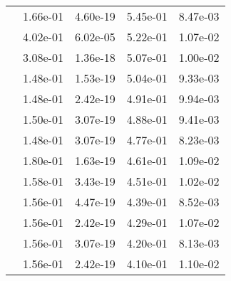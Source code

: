\begin{table}
\begin{tabular}{c|cc|cc|}
\multicolumn{1}{|c|}{} & \multicolumn{1}{|c|}{  1.66e-01} & \multicolumn{1}{|c|}{  4.60e-19} & \multicolumn{1}{|c|}{  5.45e-01} & \multicolumn{1}{|c|}{  8.47e-03} \\ 
\multicolumn{1}{|c|}{} & \multicolumn{1}{|c|}{  4.02e-01} & \multicolumn{1}{|c|}{  6.02e-05} & \multicolumn{1}{|c|}{  5.22e-01} & \multicolumn{1}{|c|}{  1.07e-02} \\ 
\multicolumn{1}{|c|}{} & \multicolumn{1}{|c|}{  3.08e-01} & \multicolumn{1}{|c|}{  1.36e-18} & \multicolumn{1}{|c|}{  5.07e-01} & \multicolumn{1}{|c|}{  1.00e-02} \\ 
\multicolumn{1}{|c|}{} & \multicolumn{1}{|c|}{  1.48e-01} & \multicolumn{1}{|c|}{  1.53e-19} & \multicolumn{1}{|c|}{  5.04e-01} & \multicolumn{1}{|c|}{  9.33e-03} \\ 
\multicolumn{1}{|c|}{} & \multicolumn{1}{|c|}{  1.48e-01} & \multicolumn{1}{|c|}{  2.42e-19} & \multicolumn{1}{|c|}{  4.91e-01} & \multicolumn{1}{|c|}{  9.94e-03} \\ 
\multicolumn{1}{|c|}{} & \multicolumn{1}{|c|}{  1.50e-01} & \multicolumn{1}{|c|}{  3.07e-19} & \multicolumn{1}{|c|}{  4.88e-01} & \multicolumn{1}{|c|}{  9.41e-03} \\ 
\multicolumn{1}{|c|}{} & \multicolumn{1}{|c|}{  1.48e-01} & \multicolumn{1}{|c|}{  3.07e-19} & \multicolumn{1}{|c|}{  4.77e-01} & \multicolumn{1}{|c|}{  8.23e-03} \\ 
\multicolumn{1}{|c|}{} & \multicolumn{1}{|c|}{  1.80e-01} & \multicolumn{1}{|c|}{  1.63e-19} & \multicolumn{1}{|c|}{  4.61e-01} & \multicolumn{1}{|c|}{  1.09e-02} \\ 
\multicolumn{1}{|c|}{} & \multicolumn{1}{|c|}{  1.58e-01} & \multicolumn{1}{|c|}{  3.43e-19} & \multicolumn{1}{|c|}{  4.51e-01} & \multicolumn{1}{|c|}{  1.02e-02} \\ 
\multicolumn{1}{|c|}{} & \multicolumn{1}{|c|}{  1.56e-01} & \multicolumn{1}{|c|}{  4.47e-19} & \multicolumn{1}{|c|}{  4.39e-01} & \multicolumn{1}{|c|}{  8.52e-03} \\ 
\multicolumn{1}{|c|}{} & \multicolumn{1}{|c|}{  1.56e-01} & \multicolumn{1}{|c|}{  2.42e-19} & \multicolumn{1}{|c|}{  4.29e-01} & \multicolumn{1}{|c|}{  1.07e-02} \\ 
\multicolumn{1}{|c|}{} & \multicolumn{1}{|c|}{  1.56e-01} & \multicolumn{1}{|c|}{  3.07e-19} & \multicolumn{1}{|c|}{  4.20e-01} & \multicolumn{1}{|c|}{  8.13e-03} \\ 
\multicolumn{1}{|c|}{} & \multicolumn{1}{|c|}{  1.56e-01} & \multicolumn{1}{|c|}{  2.42e-19} & \multicolumn{1}{|c|}{  4.10e-01} & \multicolumn{1}{|c|}{  1.10e-02} \\ 

\end{tabular}
\end{table}
